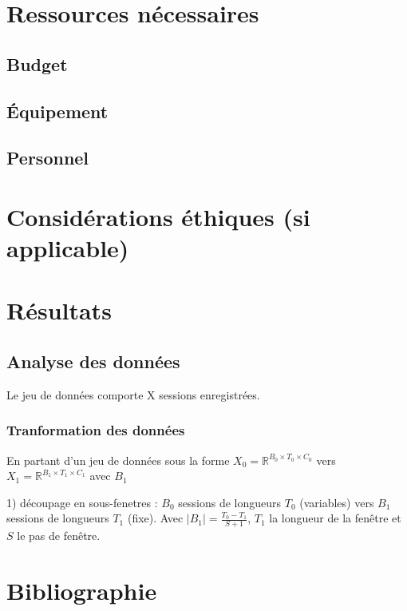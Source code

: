 \documentclass{article}
\begin{document}
    \section{Ressources nécessaires}
    \subsection{Budget}
    \subsection{Équipement}
    \subsection{Personnel}
    \section{Considérations éthiques (si applicable)}
    \section{Résultats}

    \subsection{Analyse des données}

    Le jeu de données comporte X sessions enregistrées.

    \subsubsection{Tranformation des données}

    En partant d'un jeu de données sous la forme $X_0 = \mathbb{R}^{B_0 \times T_0 \times C_0}$ vers $X_1 = \mathbb{R}^{B_1 \times T_1 \times C_1}$ avec $B_1$

    1) découpage en sous-fenetres : $B_0$ sessions de longueurs $T_0$ (variables) vers $B_1$ sessions de longueurs $T_1$ (fixe). Avec $|B_1| = \frac{T_0-T_1}{S+1}$, $T_1$ la longueur de la fenêtre et $S$ le pas de fenêtre.

    \section{Bibliographie}
\end{document}
